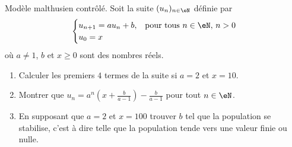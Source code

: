 
\begin{exercice}\label{exoTD3-0005}

	Modèle malthusien contrôlé. Soit la suite $(u_n)_{n\in\eN}$ définie par
	\begin{equation}\nonumber
		\begin{cases}
			u_{n+1}=au_n+b,	&	\textrm{pour tous } n\in\eN, \, n>0\\
			u_0=x
		\end{cases}
	\end{equation}
	où $a\neq 1$, $b$ et $x\geq 0$ sont des nombres réels.
	\begin{enumerate}
        \item Calculer les premiers $4$ termes de la suite si $a=2$ et $x=10$.
		\item
			Montrer que $u_n=a^n(x+\frac{ b }{ a-1 })-\frac{ b }{ a-1 }$ pour tout $n\in\eN$.
		\item
			En supposant que $a=2$ et $x=100$ trouver $b$ tel que la population se stabilise, c'est à dire telle que la population tende vers une valeur finie ou nulle.
	\end{enumerate}

\end{exercice}
